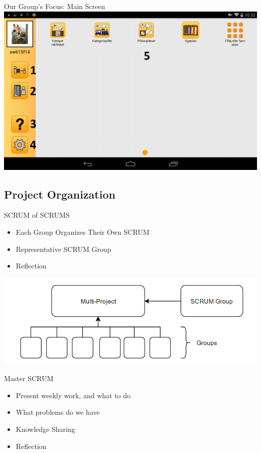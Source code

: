 \begin{frame}{Our Group's Focus: Main Screen}
\includegraphics[scale=0.28]{figures/MenuGuardian.png} 
\end{frame}

\subsection{Project Organization}
\begin{frame}{SCRUM of SCRUMS}
\begin{itemize} 
	\item Each Group Organizes Their Own SCRUM
	\item Representative SCRUM Group
	\item Reflection
\end{itemize}
\includegraphics[scale=0.42]{figures/SoS.png} 
\end{frame}

\begin{frame}{Master SCRUM}
\begin{itemize} 
	\item Present weekly work, and what to do
    \item What problems do we have
    \item Knowledge Sharing
    \item Reflection
\end{itemize}
\end{frame}


